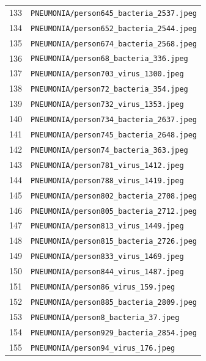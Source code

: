 \begin{longtable}{r p{12cm}}
133 & \texttt{PNEUMONIA/person645\_bacteria\_2537.jpeg} \\
134 & \texttt{PNEUMONIA/person652\_bacteria\_2544.jpeg} \\
135 & \texttt{PNEUMONIA/person674\_bacteria\_2568.jpeg} \\
136 & \texttt{PNEUMONIA/person68\_bacteria\_336.jpeg} \\
137 & \texttt{PNEUMONIA/person703\_virus\_1300.jpeg} \\
138 & \texttt{PNEUMONIA/person72\_bacteria\_354.jpeg} \\
139 & \texttt{PNEUMONIA/person732\_virus\_1353.jpeg} \\
140 & \texttt{PNEUMONIA/person734\_bacteria\_2637.jpeg} \\
141 & \texttt{PNEUMONIA/person745\_bacteria\_2648.jpeg} \\
142 & \texttt{PNEUMONIA/person74\_bacteria\_363.jpeg} \\
143 & \texttt{PNEUMONIA/person781\_virus\_1412.jpeg} \\
144 & \texttt{PNEUMONIA/person788\_virus\_1419.jpeg} \\
145 & \texttt{PNEUMONIA/person802\_bacteria\_2708.jpeg} \\
146 & \texttt{PNEUMONIA/person805\_bacteria\_2712.jpeg} \\
147 & \texttt{PNEUMONIA/person813\_virus\_1449.jpeg} \\
148 & \texttt{PNEUMONIA/person815\_bacteria\_2726.jpeg} \\
149 & \texttt{PNEUMONIA/person833\_virus\_1469.jpeg} \\
150 & \texttt{PNEUMONIA/person844\_virus\_1487.jpeg} \\
151 & \texttt{PNEUMONIA/person86\_virus\_159.jpeg} \\
152 & \texttt{PNEUMONIA/person885\_bacteria\_2809.jpeg} \\
153 & \texttt{PNEUMONIA/person8\_bacteria\_37.jpeg} \\
154 & \texttt{PNEUMONIA/person929\_bacteria\_2854.jpeg} \\
155 & \texttt{PNEUMONIA/person94\_virus\_176.jpeg} \\
\hline
\end{longtable}
